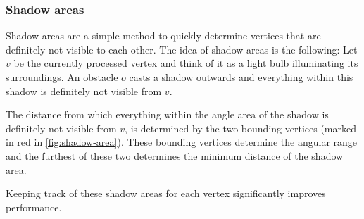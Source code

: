 			\subsubsection{Shadow areas}
			
				Shadow areas are a simple method to quickly determine vertices that are definitely not visible to each other.
				The idea of shadow areas is the following:
				Let $v$ be the currently processed vertex and think of it as a light bulb illuminating its surroundings.
				An obstacle $o$ casts a shadow outwards and everything within this shadow is definitely not visible from $v$.
				
				The distance from which everything within the angle area of the shadow is definitely not visible from $v$, is determined by the two bounding vertices (marked in red in \cref{fig:shadow-area}).
				These bounding vertices determine the angular range and the furthest of these two determines the minimum distance of the shadow area.
				
				Keeping track of these shadow areas for each vertex significantly improves performance.
				
